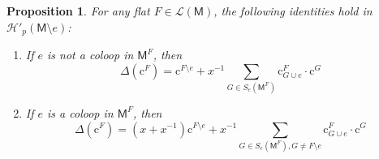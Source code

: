 \documentclass[12pt,letterpaper,english]{amsart}
\theoremstyle{teoremas}
\newtheorem{proposition}[theorem]{Proposition}
\theoremstyle{definition}
\newcommand{\M}{\mathsf{M}}
\newcommand{\cH}{\mathcal{H}}
\newcommand{\Cbasis}[1]{\mathrm{c}^{#1}}
\newcommand{\CbasisSub}[2]{\mathrm{c}^{#1}_{#2}}
\begin{document}
\begin{proposition}\label{prop:imageofDeltaCbasis}
    For any flat \(F \in \mathcal{L}(\M)\), the following identities hold in \(\cH'_p(\M \setminus e)\):
    \begin{enumerate}
        \item If \(e\) is not a coloop in \(\M^F\), then
              \begin{equation}\label{eq:imageofDeltaCbasisnoncoloop}
                  \Delta(\Cbasis{F}) = \Cbasis{F \setminus e} + x^{-1}\sum_{G \in S_e(\M^F)}\CbasisSub{F}{G\cup e} \cdot \Cbasis{G}
              \end{equation}
        \item If \(e\) is a coloop in \(\M^F\), then
              \begin{equation}\label{eq:imageofDeltaCbasiscoloop}
                  \Delta(\Cbasis{F}) = (x+x^{-1})\Cbasis{F \setminus e} + x^{-1}\sum_{G \in S_e(\M^F), G \neq F\setminus e}\CbasisSub{F}{G\cup e} \cdot \Cbasis{G}
              \end{equation}
    \end{enumerate}
\end{proposition}
\end{document}
